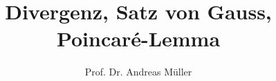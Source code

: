 %
%
%


\beamertemplatenavigationsymbolsempty
\title[div]{Divergenz, Satz von Gauss, Poincaré-Lemma}
\author[A.~Müller]{Prof. Dr. Andreas Müller}
\date[]{}

